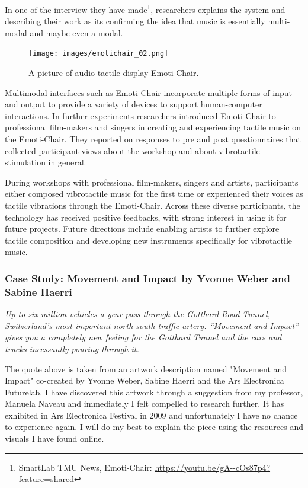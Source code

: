                 In one of the interview they have made\footnote{SmartLab TMU News, Emoti-Chair: \url{https://youtu.be/gA--cOs87p4?feature=shared}}, researchers explains the system and describing their work as its confirming the idea that music is essentially multi-modal and maybe even a-modal.\par

                \begin{figure}[H]
                    \centering
                    \texttt{[image: images/emotichair\_02.png]}
                    \caption{A picture of audio-tactile display Emoti-Chair.}
                    \label{fig:EMOTICHAIR_02}
                \end{figure}                

                Multimodal interfaces such as Emoti-Chair incorporate multiple forms of input and output to provide a variety of devices to support human-computer interactions. In further experiments researchers introduced Emoti-Chair to professional film-makers and singers in creating and experiencing tactile music on the Emoti-Chair\cite{Composing_Vibrotactile_Music}. They reported on responses to pre and post questionnaires that collected participant views about the workshop and about vibrotactile stimulation in general.\par

                During workshops with professional film-makers, singers and artists, participants either composed vibrotactile music for the first time or experienced their voices as tactile vibrations through the Emoti-Chair. Across these diverse participants, the technology has received positive feedbacks, with strong interest in using it for future projects. Future directions include enabling artists to further explore tactile composition and developing new instruments specifically for vibrotactile music.\par
            \subsubsection{Case Study: Movement and Impact by Yvonne Weber and Sabine Haerri}
                \emph{Up to six million vehicles a year pass through the Gotthard Road Tunnel, Switzerland's most important north-south traffic artery. “Movement and Impact” gives you a completely new feeling for the Gotthard Tunnel and the cars and trucks incessantly pouring through it.\cite{Movement_and_Impact_ARS}}

                The quote above is taken from an artwork description named "Movement and Impact" co-created by Yvonne Weber, Sabine Haerri and the Ars Electronica Futurelab. I have discovered this artwork through a suggestion from my professor, Manuela Naveau and immediately I felt compelled to research further. It has exhibited in Ars Electronica Festival in 2009 and unfortunately I have no chance to experience again. I will do my best to explain the piece using the resources and visuals I have found online.\par

